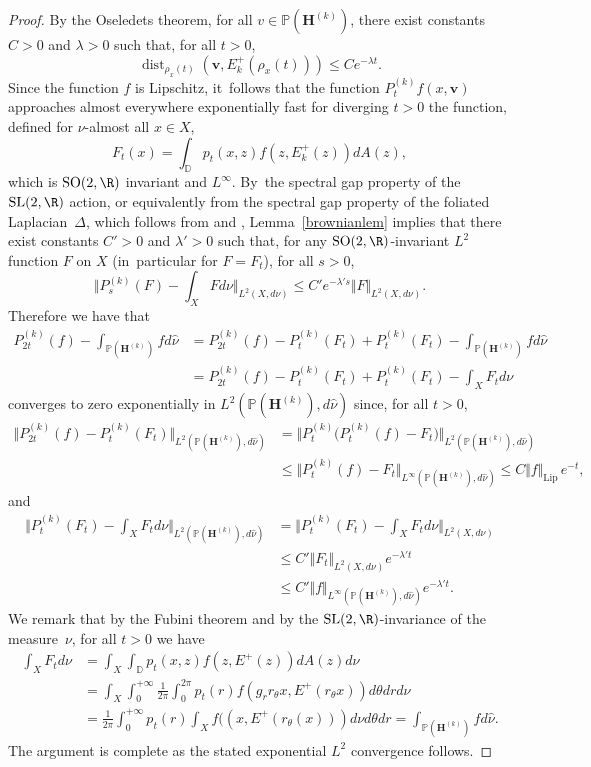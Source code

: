 \documentclass[10pt]{amsart}
\DeclareMathOperator{\dist}{dist}
\theoremstyle{plain}
\theoremstyle{definition}
\numberwithin{equation}{subsection}
\newcommand\bD{\mathbb{D}}
\newcommand\bP{\mathbb{P}}
\newcommand{\SL}{\mathrm{SL}}
\newcommand{\SO}{\mathrm{SO}}
\newcommand{\bfH}{\boldsymbol{H}}
\newcommand{\bfv}{\boldsymbol{v}}
\begin{document}
\begin{proof}
By the Oseledets theorem, for all $v \in \bP(\bfH^{(k)})$, there exist constants $C>0$ and $\lambda >0$ such that, for all $t>0$,
\[
\dist_{\rho_x(t)} (\bfv, E^+_k(\rho_{x}(t))) \leq C e^{-\lambda t}.
\]
Since the function $f$ is Lipschitz, it~follows that the function $P^{(k)}_t f(x,\bfv)$ approaches almost everywhere exponentially fast for diverging $t>0$ the function, defined for $\nu$-almost all $x\in X$,
\[
F_t(x) = \int_\bD p_t(x,z) f(z, E^+_k(z))dA(z),
\]
which is $\SO(2,\R)$ invariant and $L^\infty$. By~the spectral gap property of the $\SL(2, \R)$ action, or equivalently from the spectral gap property of the foliated Laplacian~$\Delta$, which follows from \cite{AGY06} and \cite{AG13}, Lemma~\ref{brownianlem} implies that there exist constants $C'>0$ and $\lambda' >0$ such that, for any $\SO(2,\R)$-invariant $L^2$ function $F$ on $X$ (in~particular for $F=F_t$), for all $s >0$,
\[
\biggl\Vert P^{(k)}_s (F) - \int_X F d\nu \biggr\Vert_{L^2(X, d\nu)} \leq C' e^{-\lambda' s} \Vert F \Vert_{L^2(X, d\nu)}.
\]
Therefore we have that
\[
\begin{aligned}
P^{(k)}_{2t} (f) - \int_{\bP(\bfH^{(k)})} f d\hat{\nu} &= P^{(k)}_{2t} (f) - P^{(k)}_t (F_t) + P^{(k)}_t (F_t) - \int_{\bP(\bfH^{(k)})} f d\hat{\nu} \\ &=
P^{(k)}_{2t} (f) - P^{(k)}_t (F_t) + P^{(k)}_t (F_t) - \int_X F_t d\nu
\end{aligned}
\]
converges to zero exponentially in $L^2(\bP(\bfH^{(k)}), d\hat{\nu})$
since, for all $t>0$,
\begin{align*}
\Vert P^{(k)}_{2t} (f) - P^{(k)}_t (F_t) \Vert_{L^2(\bP(\bfH^{(k)}),d\hat{\nu})} &= \Vert P^{(k)}_t \big(P^{(k)}_t(f) - F_t\big) \Vert_{L^2(\bP(\bfH^{(k)}),d\hat{\nu})}\\
&\leq \Vert P^{(k)}_t(f) - F_t \Vert_{L^\infty(\bP(\bfH^{(k)}),d\hat{\nu})} \leq
C \Vert f \Vert_\mathrm{Lip}\, e^{-t},
\end{align*}
and
\[
\begin{aligned}
\biggl\Vert P^{(k)}_t (F_t)- \int_X F_t d\nu \biggr\Vert_{L^2(\bP(\bfH^{(k)}),d\hat{\nu})} &=
\biggl\Vert P^{(k)}_t (F_t) - \int_X F_t d\nu \biggr\Vert_{L^2(X,d\nu)} \\
& \leq C' \Vert F_t \Vert_{L^2(X, d\nu)} e^{-\lambda' t}\\
&\leq C' \Vert f \Vert_{L^\infty(\bP(\bfH^{(k)}), d\hat{\nu})} e^{-\lambda' t}.
\end{aligned}
\]
We remark that by the Fubini theorem and by the $\SL(2,\R)$-invariance of the measure~$\nu$, for all $t>0$ we have
\[
\begin{aligned}
\int_X F_t d\nu&= \int_X \int_\bD p_t(x,z) f(z, E^+(z)) dA(z) d\nu \\ &= \int_X \int_0^{+\infty} \frac{1}{2\pi} \int_0^{2\pi} p_t(r) f(g_r r_\theta x, E^+(r_\theta x)) d\theta dr d\nu \\& = \frac{1}{2\pi} \int_0^{+\infty} p_t(r) \int_X f((x, E^+(r_\theta(x))) d\nu d\theta dr = \int_{\bP(\bfH^{(k)})} f d\hat{\nu}.
\end{aligned}
\]
The argument is complete as the stated exponential $L^2$
convergence follows.
\end{proof}
\end{document}

